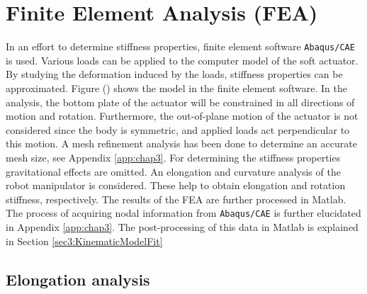 
\section{Finite Element Analysis (FEA)}

In an effort to determine stiffness properties, finite element software \verb+Abaqus/CAE+ is used. Various loads can be applied to the computer model of the soft actuator. By studying the deformation induced by the loads, stiffness properties can be approximated. Figure () shows the model in the finite element software. In the analysis, the bottom plate of the actuator will be constrained in all directions of motion and rotation. Furthermore, the out-of-plane motion of the actuator is not considered since the body is symmetric, and applied loads act perpendicular to this motion. A mesh refinement analysis has been done to determine an accurate mesh size, see Appendix \ref{app:chap3}. For determining the stiffness properties gravitational effects are omitted. An elongation and curvature analysis of the robot manipulator is considered. These help to obtain elongation and rotation stiffness, respectively. The results of the FEA are further processed in Matlab. The process of acquiring nodal information from \verb+Abaqus/CAE+ is further elucidated in Appendix \ref{app:chap3}. The post-processing of this data in Matlab is explained in Section \ref{sec3:KinematicModelFit}  













\subsection{Elongation analysis}


